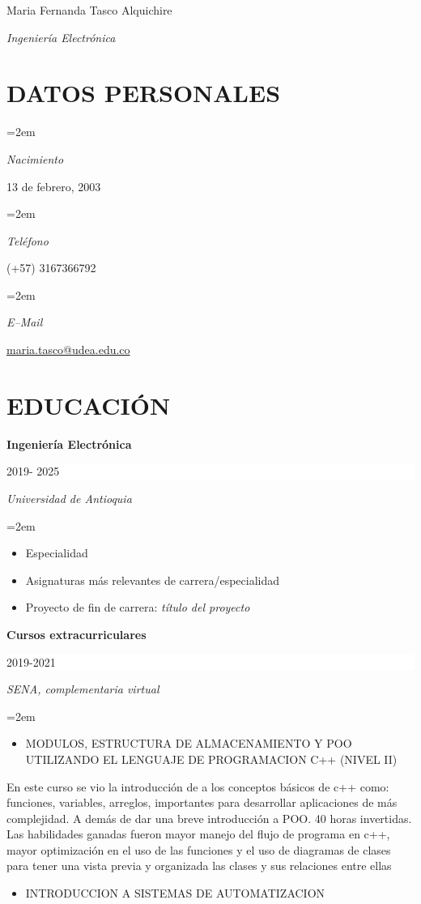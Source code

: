 \documentclass[paper=a4,fontsize=11pt]{scrartcl} %
\newlength{\spacebox}
\newcommand{\sepspace}{\vspace*{1em}}		%
\newcommand{\MyName}[1]{ %
		\Huge \usefont{OT1}{phv}{b}{n} \hfill #1
		\par \normalsize \normalfont}
\newcommand{\MySlogan}[1]{ %
		\large \usefont{OT1}{phv}{m}{n}\hfill \textit{#1}
		\par \normalsize \normalfont}
\newcommand{\NewPart}[1]{\section*{\uppercase{#1}}}
\newcommand{\PersonalEntry}[2]{
		\noindent\hangindent=2em\hangafter=0 %
		\parbox{\spacebox}{        %
		\textit{#1}}		       %
		\hspace{1.5em} #2 \par}    %
\newcommand{\EducationEntry}[4]{
		\noindent \textbf{#1} \hfill      %
		\colorbox{White}{%
			\parbox{5cm}{%
			\hfill\color{Black}#2}} \par  %
		\noindent \textit{#3} \par        %
		\noindent\hangindent=2em\hangafter=0 \small #4 %
		\normalsize \par}
\begin{document}

\MyName{Maria Fernanda Tasco Alquichire}
\MySlogan{Ingeniería Electrónica}

\sepspace

\NewPart{Datos personales}{}

\PersonalEntry{Nacimiento}{13 de febrero, 2003}
\PersonalEntry{Teléfono}{(+57) 3167366792}
\PersonalEntry{E--Mail}{\url{maria.tasco@udea.edu.co}}

\NewPart{Educación}{}

\EducationEntry{Ingeniería Electrónica}{2019- 2025}{Universidad de Antioquia}{
\begin{itemize}
\item{Especialidad }
\item{Asignaturas más relevantes de carrera/especialidad}
\item{Proyecto de fin de carrera: \emph{título del proyecto}}
\end{itemize}
}

\sepspace

\EducationEntry{Cursos extracurriculares}{2019-2021}{SENA, complementaria virtual}
{
\begin{itemize}
\item{MODULOS, ESTRUCTURA DE ALMACENAMIENTO Y POO UTILIZANDO EL LENGUAJE DE PROGRAMACION C++ (NIVEL II)}
\end{itemize}
}


{En este curso se vio la introducción de  a los  conceptos  básicos  de c++ como:  funciones,  variables,  arreglos, importantes para desarrollar aplicaciones de más complejidad. A demás de dar una breve introducción a POO. 40 horas invertidas. Las habilidades ganadas fueron mayor manejo del flujo de programa en c++, mayor optimización en el uso de las funciones y el uso de diagramas de clases para tener una vista previa y organizada las clases y sus relaciones entre ellas}


{
\begin{itemize}
\item{INTRODUCCION A SISTEMAS DE AUTOMATIZACION}
\end{itemize}
}
\end{document}
